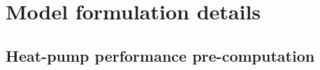 \documentclass[a4paper,fleqn]{cas-sc} %
\providecommand{\DIFaddbegin}{} %
\providecommand{\DIFaddend}{} %
\providecommand{\DIFdelbegin}{} %
\providecommand{\DIFdelend}{} %
\providecommand{\ce}[1]{\ensuremath{\mathrm{#1}}}
\begin{document}
{{%


\DIFdelend \section{Model formulation details}
\label{app:model_details}

\DIFdelbegin %
\DIFdelend \DIFaddbegin \subsection{Heat-pump performance pre-computation}
\DIFaddend \label{app:cop}

}}
\end{document}
